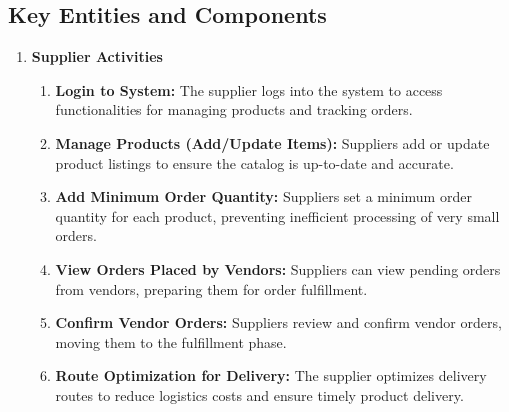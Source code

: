 \subsection{Key Entities and Components}
\begin{enumerate}
    \item \textbf{Supplier Activities}
          \begin{enumerate}
              \item \textbf{Login to System:} The supplier logs into the system to access functionalities for managing products and tracking orders.
              \item \textbf{Manage Products (Add/Update Items):} Suppliers add or update product listings to ensure the catalog is up-to-date and accurate.
              \item \textbf{Add Minimum Order Quantity:} Suppliers set a minimum order quantity for each product, preventing inefficient processing of very small orders.
              \item \textbf{View Orders Placed by Vendors:} Suppliers can view pending orders from vendors, preparing them for order fulfillment.
              \item \textbf{Confirm Vendor Orders:} Suppliers review and confirm vendor orders, moving them to the fulfillment phase.
              \item \textbf{Route Optimization for Delivery:} The supplier optimizes delivery routes to reduce logistics costs and ensure timely product delivery.
          \end{enumerate}


\end{enumerate}
